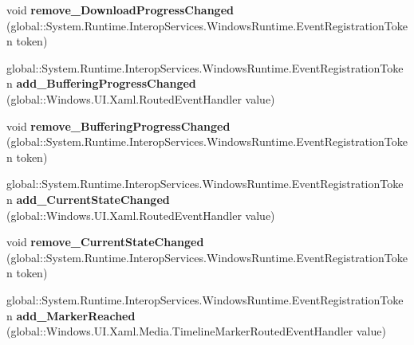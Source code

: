 \begin{DoxyCompactItemize}
void {\bfseries remove\+\_\+\+Download\+Progress\+Changed} (global\+::\+System.\+Runtime.\+Interop\+Services.\+Windows\+Runtime.\+Event\+Registration\+Token token)
\item 
\mbox{\label{interface_windows_1_1_u_i_1_1_xaml_1_1_controls_1_1_i_media_element_a84b55fbe2bab2bbb0288457d0c16c52c}} 
global\+::\+System.\+Runtime.\+Interop\+Services.\+Windows\+Runtime.\+Event\+Registration\+Token {\bfseries add\+\_\+\+Buffering\+Progress\+Changed} (global\+::\+Windows.\+U\+I.\+Xaml.\+Routed\+Event\+Handler value)
\item 
\mbox{\label{interface_windows_1_1_u_i_1_1_xaml_1_1_controls_1_1_i_media_element_a080932b18d45c0da51366f4fe31041cf}} 
void {\bfseries remove\+\_\+\+Buffering\+Progress\+Changed} (global\+::\+System.\+Runtime.\+Interop\+Services.\+Windows\+Runtime.\+Event\+Registration\+Token token)
\item 
\mbox{\label{interface_windows_1_1_u_i_1_1_xaml_1_1_controls_1_1_i_media_element_a357521c35f1e1c53f78bf72c62939f5f}} 
global\+::\+System.\+Runtime.\+Interop\+Services.\+Windows\+Runtime.\+Event\+Registration\+Token {\bfseries add\+\_\+\+Current\+State\+Changed} (global\+::\+Windows.\+U\+I.\+Xaml.\+Routed\+Event\+Handler value)
\item 
\mbox{\label{interface_windows_1_1_u_i_1_1_xaml_1_1_controls_1_1_i_media_element_ae3f1850941fbf004a45cd333886cd5ff}} 
void {\bfseries remove\+\_\+\+Current\+State\+Changed} (global\+::\+System.\+Runtime.\+Interop\+Services.\+Windows\+Runtime.\+Event\+Registration\+Token token)
\item 
\mbox{\label{interface_windows_1_1_u_i_1_1_xaml_1_1_controls_1_1_i_media_element_abe1f11754f86e35e5a3b093554c58043}} 
global\+::\+System.\+Runtime.\+Interop\+Services.\+Windows\+Runtime.\+Event\+Registration\+Token {\bfseries add\+\_\+\+Marker\+Reached} (global\+::\+Windows.\+U\+I.\+Xaml.\+Media.\+Timeline\+Marker\+Routed\+Event\+Handler value)
\item 
\mbox{\label{interface_windows_1_1_u_i_1_1_xaml_1_1_controls_1_1_i_media_element_a0238b7aba4ea8d50a18b11bbccde3c0c}} 

\end{DoxyCompactItemize}
